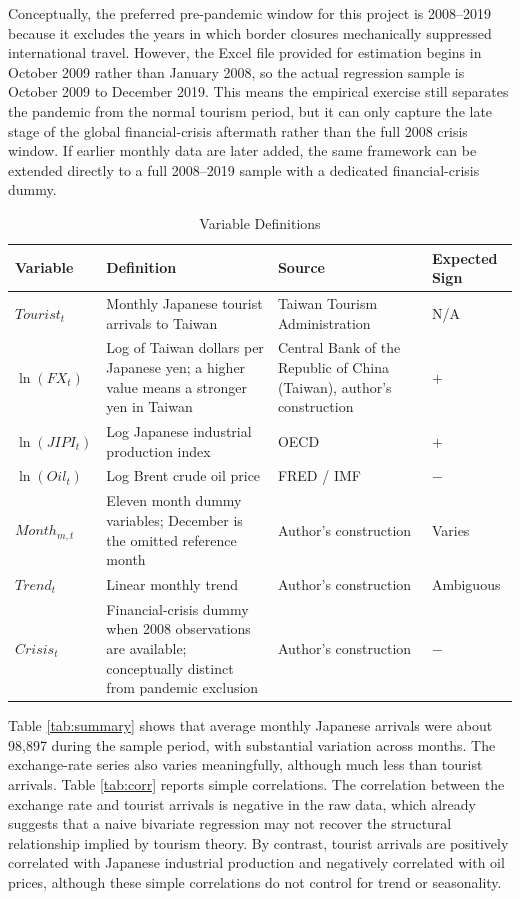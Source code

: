 \documentclass[12pt,a4paper]{article}
\begin{document}
Conceptually, the preferred pre-pandemic window for this project is 2008--2019 because it excludes the years in which border closures mechanically suppressed international travel. However, the Excel file provided for estimation begins in October 2009 rather than January 2008, so the actual regression sample is October 2009 to December 2019. This means the empirical exercise still separates the pandemic from the normal tourism period, but it can only capture the late stage of the global financial-crisis aftermath rather than the full 2008 crisis window. If earlier monthly data are later added, the same framework can be extended directly to a full 2008--2019 sample with a dedicated financial-crisis dummy.

\begin{table}[H]
\centering
\caption{Variable Definitions}
\label{tab:variables}
\begin{tabular}{p{3.0cm}p{7.1cm}p{3.3cm}p{1.5cm}}
\toprule
Variable & Definition & Source & Expected Sign \\
\midrule
$Tourist_t$ & Monthly Japanese tourist arrivals to Taiwan & Taiwan Tourism Administration & N/A \\
$\ln(FX_t)$ & Log of Taiwan dollars per Japanese yen; a higher value means a stronger yen in Taiwan & Central Bank of the Republic of China (Taiwan), author's construction & $+$ \\
$\ln(JIPI_t)$ & Log Japanese industrial production index & OECD & $+$ \\
$\ln(Oil_t)$ & Log Brent crude oil price & FRED / IMF & $-$ \\
$Month_{m,t}$ & Eleven month dummy variables; December is the omitted reference month & Author's construction & Varies \\
$Trend_t$ & Linear monthly trend & Author's construction & Ambiguous \\
$Crisis_t$ & Financial-crisis dummy when 2008 observations are available; conceptually distinct from pandemic exclusion & Author's construction & $-$ \\
\bottomrule
\end{tabular}
\end{table}




Table \ref{tab:summary} shows that average monthly Japanese arrivals were about 98,897 during the sample period, with substantial variation across months. The exchange-rate series also varies meaningfully, although much less than tourist arrivals. Table \ref{tab:corr} reports simple correlations. The correlation between the exchange rate and tourist arrivals is negative in the raw data, which already suggests that a naive bivariate regression may not recover the structural relationship implied by tourism theory. By contrast, tourist arrivals are positively correlated with Japanese industrial production and negatively correlated with oil prices, although these simple correlations do not control for trend or seasonality.
\end{document}
